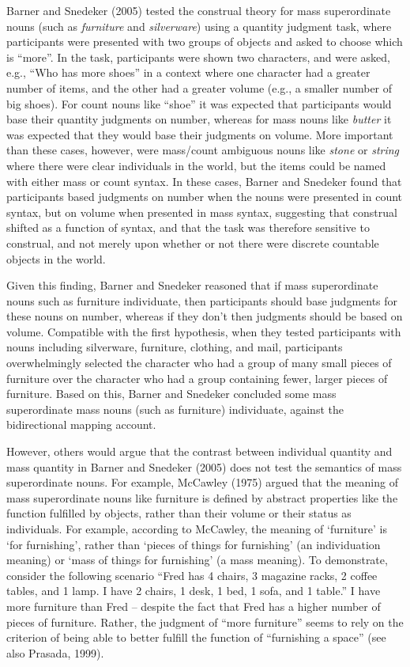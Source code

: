 \documentclass[
  man,floatsintext]{apa6}
\begin{document}
Barner and Snedeker (2005) tested the construal theory for mass superordinate nouns (such as \emph{furniture} and \emph{silverware}) using a quantity judgment task, where participants were presented with two groups of objects and asked to choose which is ``more''. In the task, participants were shown two characters, and were asked, e.g., ``Who has more shoes'' in a context where one character had a greater number of items, and the other had a greater volume (e.g., a smaller number of big shoes). For count nouns like ``shoe'' it was expected that participants would base their quantity judgments on number, whereas for mass nouns like \emph{butter} it was expected that they would base their judgments on volume. More important than these cases, however, were mass/count ambiguous nouns like \emph{stone} or \emph{string} where there were clear individuals in the world, but the items could be named with either mass or count syntax. In these cases, Barner and Snedeker found that participants based judgments on number when the nouns were presented in count syntax, but on volume when presented in mass syntax, suggesting that construal shifted as a function of syntax, and that the task was therefore sensitive to construal, and not merely upon whether or not there were discrete countable objects in the world.

Given this finding, Barner and Snedeker reasoned that if mass superordinate nouns such as furniture individuate, then participants should base judgments for these nouns on number, whereas if they don't then judgments should be based on volume. Compatible with the first hypothesis, when they tested participants with nouns including silverware, furniture, clothing, and mail, participants overwhelmingly selected the character who had a group of many small pieces of furniture over the character who had a group containing fewer, larger pieces of furniture. Based on this, Barner and Snedeker concluded some mass superordinate mass nouns (such as furniture) individuate, against the bidirectional mapping account.

However, others would argue that the contrast between individual quantity and mass quantity in Barner and Snedeker (2005) does not test the semantics of mass superordinate nouns. For example, McCawley (1975) argued that the meaning of mass superordinate nouns like furniture is defined by abstract properties like the function fulfilled by objects, rather than their volume or their status as individuals. For example, according to McCawley, the meaning of `furniture' is `for furnishing', rather than `pieces of things for furnishing' (an individuation meaning) or `mass of things for furnishing' (a mass meaning). To demonstrate, consider the following scenario ``Fred has 4 chairs, 3 magazine racks, 2 coffee tables, and 1 lamp. I have 2 chairs, 1 desk, 1 bed, 1 sofa, and 1 table.'' I have more furniture than Fred -- despite the fact that Fred has a higher number of pieces of furniture. Rather, the judgment of ``more furniture'' seems to rely on the criterion of being able to better fulfill the function of ``furnishing a space'' (see also Prasada, 1999).
\end{document}
